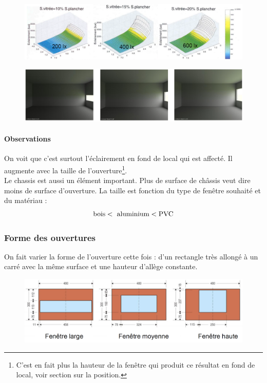 \documentclass[11pt]{report}
\begin{document}
\begin{figure}[h]
\centering
\includegraphics[width=\linewidth]{gra1}
\end{figure}

\begin{figure}[h]
\centering
\includegraphics[width=\linewidth]{pho1}
\end{figure}


\paragraph{Observations} On voit que c'est surtout l'éclairement en fond de local qui est affecté. Il augmente avec la taille de l'ouverture\footnote{C'est en fait plus la hauteur de la fenêtre qui produit ce résultat en fond de local, voir section sur la position.}. \\

Le chassis est aussi un élément important. Plus de surface de châssis veut dire moins de surface d'ouverture. La taille est fonction du type de fenêtre souhaité et du matériau :
$$\textup{bois} <\textup{ aluminium} < \textup{PVC}$$






\newpage
\subsubsection{Forme des ouvertures}
On fait varier la forme de l'ouverture cette fois : d'un rectangle très allongé à un carré avec la même surface et une hauteur d'allège constante.

\begin{figure}[h]
\centering
\includegraphics[width=0.6\linewidth]{forme}
\end{figure}
\end{document}
